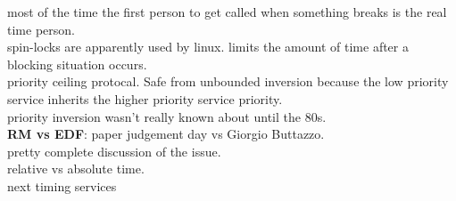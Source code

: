 \documentclass{article}
\begin{document}
most of the time the first person to get called when something breaks is the real time person.\\

spin-locks are apparently used by linux. limits the amount of time after a blocking situation occurs.\\

priority ceiling protocal. Safe from unbounded inversion because the low priority service inherits the higher priority service priority.\\

priority inversion wasn't really known about until the 80s.\\


\textbf{RM vs EDF}:
paper judgement day vs Giorgio Buttazzo.\\
pretty complete discussion of the issue.\\
relative vs absolute time.\\

next timing services
\end{document}
